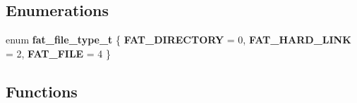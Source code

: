 \subsection*{Enumerations}
\begin{DoxyCompactItemize}
\item 
\mbox{\label{group__libfs__ff_gac74c41b0ee6699afd65a52107ac492ee}} 
enum {\bfseries fat\+\_\+file\+\_\+type\+\_\+t} \{ {\bfseries F\+A\+T\+\_\+\+D\+I\+R\+E\+C\+T\+O\+RY} = 0, 
{\bfseries F\+A\+T\+\_\+\+H\+A\+R\+D\+\_\+\+L\+I\+NK} = 2, 
{\bfseries F\+A\+T\+\_\+\+F\+I\+LE} = 4
 \}
\end{DoxyCompactItemize}
\subsection*{Functions}
